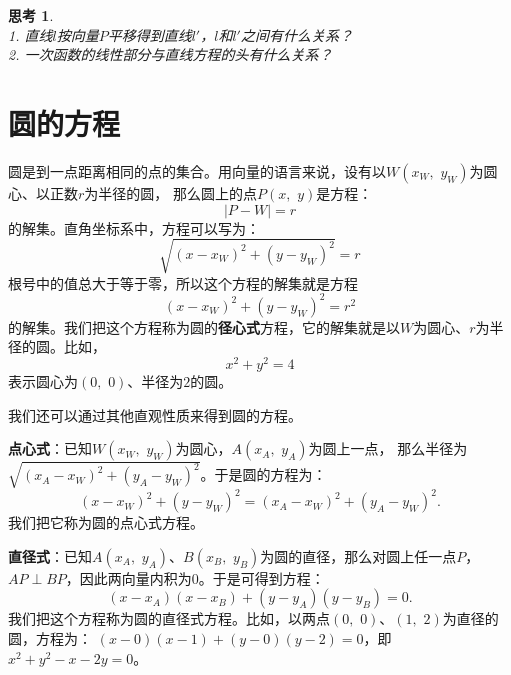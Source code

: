 \documentclass[12pt,UTF8]{ctexbook}
\newtheorem{sk}{思考}[section]
\begin{document}
\begin{sk}
    \mbox{}\\
    1. 直线$l$按向量$P$平移得到直线$l'$，$l$和$l'$之间有什么关系？ \\
    2. 一次函数的线性部分与直线方程的头有什么关系？
\end{sk}

\section{圆的方程}

圆是到一点距离相同的点的集合。用向量的语言来说，设有以$W(x_W,\,\, y_W)$为圆心、以正数$r$为半径的圆，
那么圆上的点$P(x, \,\,y)$是方程：
$$|P - W| = r$$
的解集。直角坐标系中，方程可以写为：
$$\sqrt{(x - x_W)^2 + (y - y_W)^2} = r$$
根号中的值总大于等于零，所以这个方程的解集就是方程
$$(x - x_W)^2 + (y - y_W)^2 = r^2$$
的解集。我们把这个方程称为圆的\textbf{径心式}方程，它的解集就是以$W$为圆心、$r$为半径的圆。比如，
$$x^2 + y^2 = 4$$
表示圆心为$(0,\,\,0)$、半径为$2$的圆。

我们还可以通过其他直观性质来得到圆的方程。

\textbf{点心式}：已知$W(x_W,\,\, y_W)$为圆心，$A(x_A,\,\,y_A)$为圆上一点，
那么半径为$\sqrt{(x_A - x_W)^2 + (y_A - y_W)^2}$。于是圆的方程为：
$$ (x - x_W)^2 + (y - y_W)^2 = (x_A - x_W)^2 + (y_A - y_W)^2.$$
我们把它称为圆的点心式方程。

\textbf{直径式}：已知$A(x_A,\,\,y_A)$、$B(x_B,\,\,y_B)$为圆的直径，那么对圆上任一点$P$，$AP\perp BP$，因此两向量内积为$0$。于是可得到方程：
$$ (x - x_A)(x - x_B) + (y - y_A)(y - y_B) = 0.$$
我们把这个方程称为圆的直径式方程。比如，以两点$(0,\,\,0)$、$(1,\,\,2)$为直径的圆，方程为：
$ (x - 0)(x - 1) + (y - 0)(y - 2) = 0$，即$x^2 + y^2 - x - 2y = 0$。
\end{document}
